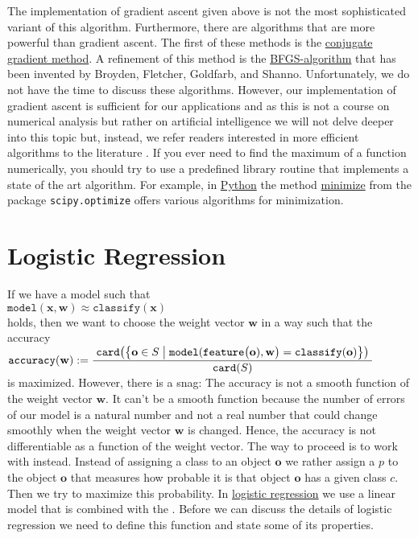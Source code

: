 The implementation of gradient ascent given above is not the most sophisticated variant of this algorithm.
Furthermore, there are algorithms that are more powerful than gradient ascent.  The first of these methods is the
\href{https://en.wikipedia.org/wiki/Conjugate_gradient_method}{conjugate gradient method}.  A
refinement of this method is the
\href{https://en.wikipedia.org/wiki/Broyden-Fletcher-Goldfarb-Shanno_algorithm}{BFGS-algorithm} that
has been invented by Broyden, Fletcher, Goldfarb, and Shanno.  Unfortunately, we do not have the
time to discuss these algorithms.
However, our implementation of gradient ascent is sufficient for our applications and as this is not a course on numerical
analysis but rather on artificial intelligence we will not delve deeper into this topic but, instead, we refer
readers interested in more efficient algorithms to the literature \cite{snyman:2005}.  If you ever need to find
the maximum of a function numerically, you should try to use a predefined library routine that implements a
state of the art algorithm.  For example, in \href{https://www.python.org}{Python} the method
\href{https://docs.scipy.org/doc/scipy/reference/generated/scipy.optimize.minimize.html#scipy.optimize.minimize}{minimize}
from the package \texttt{scipy.optimize} offers various algorithms for minimization.

\section{Logistic Regression}
If we have a model such that 
\\[0.2cm]
\hspace*{1.3cm}
$\mathtt{model}(\mathbf{x}, \mathbf{w}) \approx \mathtt{classify}(\mathbf{x})$
\\[0.2cm]
holds, then we want to choose the weight vector $\mathbf{w}$ in a way such that the accuracy 
\\[0.2cm]
\hspace*{1.3cm}
$\displaystyle \mathtt{accuracy}(\mathbf{w}) := 
\frac{\;\mathtt{card}\bigl(\bigl\{ \mathbf{o} \in S \bigm| \mathtt{model}(\mathtt{feature}\bigl(\mathbf{o}),\mathbf{w}\bigr) = \mathtt{classify}(\mathbf{o})\bigr\}\bigr)\;}{\mathtt{card}(S)}$
\\[0.2cm]
is maximized.  However, there is a snag:  The accuracy is not a smooth function of the weight vector
$\mathbf{w}$.  It can't be a smooth function because the number of errors of our model is a natural number and not a real number
that could change smoothly when the weight vector $\mathbf{w}$ is changed.  Hence, the accuracy is not differentiable as a function
of the weight vector.  The way to proceed is to work with  instead.  Instead of assigning a
class to an object $\mathbf{o}$ we rather assign a  $p$ to the object $\mathbf{o}$ that measures how
probable it is that object $\mathbf{o}$ has a given class $c$.  Then we try to maximize this probability.  In
\href{https://en.wikipedia.org/wiki/Logistic_regression}{logistic regression} we use a linear model that is 
combined with the .  Before we can discuss the details of logistic regression we need to
define this function and state some of its properties.  

